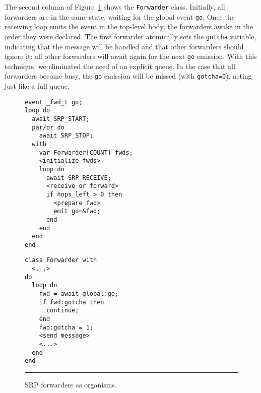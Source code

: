 \documentclass[10pt]{sensys-proc}
\newcommand{\CEU}{\textsc{C\'{e}u}\xspace}
\newcommand{\code}[1] {{\small{\texttt{#1}}}}
\begin{document}
The second column of Figure~\ref{lst.srp} shows the \code{Forwarder} class.
Initially, all forwarders are in the same state, waiting for the global event 
\code{go}.
Once the receiving loop emits the event in the top-level body, the forwarders 
awake in the order they were declared.
The first forwarder atomically sets the \code{gotcha} variable, indicating that 
the message will be handled and that other forwarders should ignore it:
all other forwarders will await again for the next \code{go} emission.
With this technique, we eliminated the need of an explicit queue.
In the case that all forwarders become busy, the \code{go} emission will be 
missed (with \code{gotcha=0}), acting just like a full queue.

\begin{comment}
Note that \CEU organisms are not global entities and do not use the heap for 
memory.
Instead, they are bounded to the scope they are declared, and all memory is 
statically allocated, just like \CEU does for standard local variables.
Also, when an organism goes out of scope, the same automatic bookkeeping of 
\code{par/or} compositions holds, all internal trails are killed and 
finalization blocks execute (if any).
Hence, the ``garbage collection'' for both the memory and code in organisms is 
efficient and static.
Although \CEU does not support dynamic creation (which could lead do unbounded 
memory), scoped organisms offer some degree of flexibility when compared to 
systems providing global objects only~\cite{wsn.virgil,wsn.flowtalk}.
\end{comment}


\begin{figure}[t]
\begin{minipage}[t]{0.45\linewidth}
{\small
\begin{verbatim}
event _fwd_t go;
loop do
  await SRP_START;
  par/or do
    await SRP_STOP;
  with
    var Forwarder[COUNT] fwds;
    <initialize fwds>
    loop do
      await SRP_RECEIVE;
      <receive or forward>
      if hops_left > 0 then
        <prepare fwd>
        emit go=&fwd;
      end
    end
  end
end
\end{verbatim}
}
\end{minipage}
%
\hspace{0.0cm}
%
\begin{minipage}[t]{0.45\linewidth}
{\small
\begin{verbatim}
class Forwarder with
  <...>
do
  loop do
    fwd = await global:go;
    if fwd:gotcha then
      continue;
    end
    fwd:gotcha = 1;
    <send message>
    <...>
  end
end
\end{verbatim}
}
\end{minipage}
\rule{8.5cm}{0.37pt}
\caption{ SRP forwarders as organisms.
\label{lst.srp}
}
\end{figure}
\end{document}
